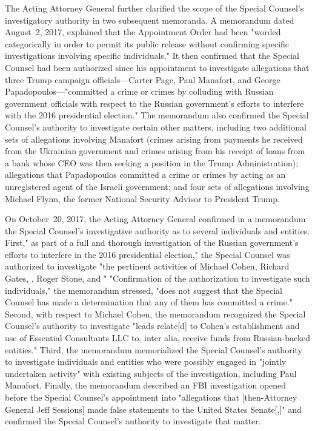The Acting Attorney General further clarified the scope of the Special Counsel's investigatory authority in two subsequent memoranda.
A memorandum dated August~2, 2017, explained that the Appointment Order had been "worded categorically in order to permit its public release without confirming specific investigations involving specific individuals."
It then confirmed that the Special Counsel had been authorized since his appointment to investigate allegations that three Trump campaign officials---Carter Page, Paul Manafort, and George Papadopoulos---"committed a crime or crimes by colluding with Russian government officials with respect to the Russian government's efforts to interfere with the 2016 presidential election."
The memorandum also confirmed the Special Counsel's authority to investigate certain other matters, including two additional sets of allegations involving Manafort (crimes arising from payments he received from the Ukrainian government and crimes arising from his receipt of loans from a bank whose CEO was then seeking a position in the Trump Administration); allegations that Papadopoulos committed a crime or crimes by acting as an unregistered agent of the Israeli government; and four sets of allegations involving Michael Flynn, the former National Security Advisor to President Trump.

On October~20, 2017, the Acting Attorney General confirmed in a memorandum the Special Counsel's investigative authority as to several individuals and entities.
First," as part of a full and thorough investigation of the Russian government's efforts to interfere in the 2016 presidential election," the Special Counsel was authorized to investigate "the pertinent activities of Michael Cohen, Richard Gates, , Roger Stone, and " "Confirmation of the authorization to investigate such individuals," the memorandum stressed, "does not suggest that the Special Counsel has made a determination that any of them has committed a crime."
Second, with respect to Michael Cohen, the memorandum recognized the Special Counsel's authority to investigate "leads relate[d] to Cohen's establishment and use of Essential Consultants LLC to, inter alia, receive funds from Russian-backed entities."
Third, the memorandum memorialized the Special Counsel's authority to investigate individuals and entities who were possibly engaged in "jointly undertaken activity" with existing subjects of the investigation, including Paul Manafort.
Finally, the memorandum described an FBI investigation opened before the Special Counsel's appointment into "allegations that [then-Attorney General Jeff Sessions] made false statements to the United States Senate[,]" and confirmed the Special Counsel's authority to investigate that matter.

